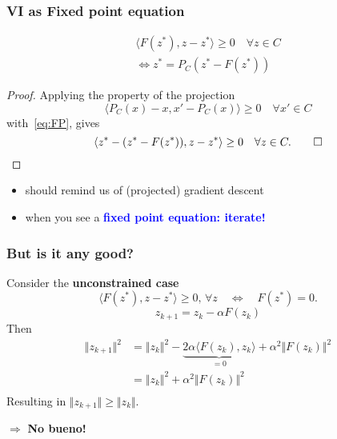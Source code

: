 \documentclass[aspectratio=149]{beamer}
\begin{document}
\begin{frame}
  \frametitle{VI as Fixed point equation}
  \begin{block}{}
    \vspace{-0.5cm}
  \begin{align}
    \langle F(z^*), z-z^* \rangle \ge 0 \quad \forall z \in C \\
    \Leftrightarrow z^* = P_C (z^* - F(z^*)) \label{eq:FP}\tag{FP}
  \end{align}
  \end{block}
  \begin{proof}
    Applying the property of the projection
    \begin{equation}
      \langle P_C(x)-x, x' - P_C(x) \rangle \ge 0 \quad \forall x' \in C
    \end{equation}
    with~\eqref{eq:FP}, gives
    \begin{equation}
    \langle z^* - (z^* - F(z^*)), z-z^* \rangle \ge 0 \quad \forall z \in C.\hfill \qedhere\qed
    \end{equation}
  \end{proof}
  \begin{itemize}
    \item should remind us of (projected) gradient descent
          \item when you see a \textbf{\textcolor{blue}{fixed point equation: iterate!}}
  \end{itemize}
\end{frame}


\begin{frame}
  \frametitle{But is it any good?}
  Consider the \textbf{unconstrained case}
  \begin{equation}
    \langle F(z^*), z-z^* \rangle \ge 0 , \, \forall z  \quad \Leftrightarrow \quad F(z^*) = 0.
  \end{equation}
  \begin{equation}
    z_{k+1} = z_k - \alpha F(z_k)
  \end{equation}
  Then
  \begin{equation}
    \begin{aligned}
      \Vert z_{k+1} \Vert^2 &= \Vert z_k \Vert^2 - \underbrace{2 \alpha \langle F(z_k), z_k \rangle}_{=0} + \alpha^2 \Vert F(z_k) \Vert^2 \\
      &=\Vert z_k \Vert^2 + \alpha^2 \Vert F(z_k) \Vert^2 \\
    \end{aligned}
  \end{equation}
  Resulting in $\Vert z_{k+1} \Vert \ge \Vert z_k \Vert$.
  \begin{center}
    $\Rightarrow$ \textbf{No bueno!}
  \end{center}
\end{frame}
\end{document}
